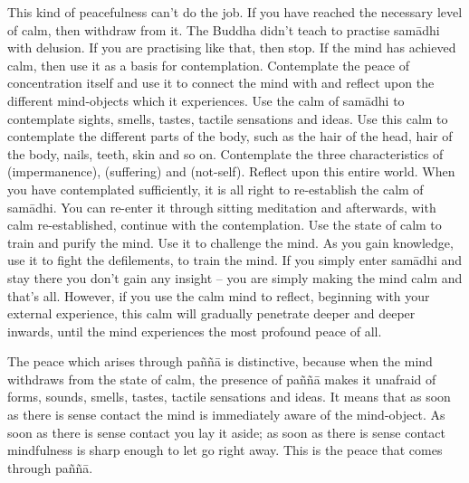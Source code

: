 This kind of peacefulness can't do the job. If you have reached the necessary level of calm, then withdraw from it. The Buddha didn't teach to practise sam\=adhi with delusion. If you are practising like that, then stop. If the mind has achieved calm, then use it as a basis for contemplation. Contemplate the peace of concentration itself and use it to connect the mind with and reflect upon the different mind-objects which it experiences. Use the calm of sam\=adhi to contemplate sights, smells, tastes, tactile sensations and ideas. Use this calm to contemplate the different parts of the body, such as the hair of the head, hair of the body, nails, teeth, skin and so on. Contemplate the three characteristics of  (impermanence),  (suffering) and  (not-self). Reflect upon this entire world. When you have contemplated sufficiently, it is all right to re-establish the calm of sam\=adhi. You can re-enter it through sitting meditation and afterwards, with calm re-established, continue with the contemplation. Use the state of calm to train and purify the mind. Use it to challenge the mind. As you gain knowledge, use it to fight the defilements, to train the mind. If you simply enter sam\=adhi and stay there you don't gain any insight -- you are simply making the mind calm and that's all. However, if you use the calm mind to reflect, beginning with your external experience, this calm will gradually penetrate deeper and deeper inwards, until the mind experiences the most profound peace of all.

The peace which arises through pa\~n\~n\=a is distinctive, because when the mind withdraws from the state of calm, the presence of pa\~n\~n\=a makes it unafraid of forms, sounds, smells, tastes, tactile sensations and ideas. It means that as soon as there is sense contact the mind is immediately aware of the mind-object. As soon as there is sense contact you lay it aside; as soon as there is sense contact mindfulness is sharp enough to let go right away. This is the peace that comes through pa\~n\~n\=a.

